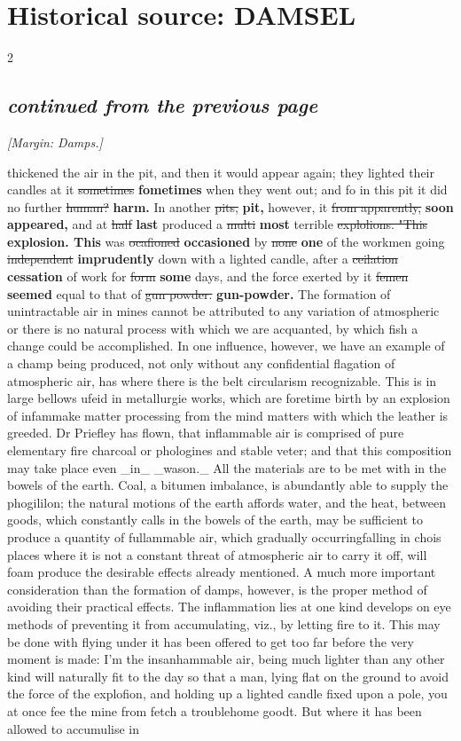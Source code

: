\documentclass[10pt]{article}
\begin{document}
\section*{Historical source: DAMSEL}
\begin{multicols}{2}
\subsection*{\textit{continued from the previous page}}
{\small\itshape [Margin: Damps.]}\par
thickened the air in the pit, and then it would appear again; they lighted their candles at it \sout{sometimes} \textbf{fometimes} when they went out; and fo in this pit it did no further \sout{human?} \textbf{harm.} In another \sout{pits,} \textbf{pit,} however, it \sout{from apparently,} \textbf{soon appeared,} and at \sout{half} \textbf{last} produced a \sout{multi} \textbf{most} terrible \sout{explolions. "This} \textbf{explosion. This} was \sout{ocafioned} \textbf{occasioned} by \sout{none} \textbf{one} of the workmen going \sout{independent} \textbf{imprudently} down with a lighted candle, after a \sout{ceilation} \textbf{cessation} of work for \sout{form} \textbf{some} days, and the force exerted by it \sout{femen} \textbf{seemed} equal to that of \sout{gun powder.} \textbf{gun-powder.} The formation of unintractable air in mines cannot be attributed to any variation of atmospheric or there is no natural process with which we are acquanted, by which fish a change could be accomplished. In one influence, however, we have an example of a champ being produced, not only without any confidential flagation of atmospheric air, has where there is the belt circularism recognizable. This is in large bellows ufeid in metallurgie works, which are foretime birth by an explosion of infammake matter processing from the mind matters with which the leather is greeded. Dr Priefley has flown, that inflammable air is comprised of pure elementary fire charcoal or phologines and stable veter; and that this composition may take place even \_in\_ \_wason.\_ All the materials are to be met with in the bowels of the earth. Coal, a bitumen imbalance, is abundantly able to supply the phogililon; the natural motions of the earth affords water, and the heat, between goods, which constantly calls in the bowels of the earth, may be sufficient to produce a quantity of fullammable air, which gradually occurringfalling in chois places where it is not a constant threat of atmospheric air to carry it off, will foam produce the desirable effects already mentioned. A much more important consideration than the formation of damps, however, is the proper method of avoiding their practical effects. The inflammation lies at one kind develops on eye methods of preventing it from accumulating, viz., by letting fire to it. This may be done with flying under it has been offered to get too far before the very moment is made: I’m the insanhammable air, being much lighter than any other kind will naturally fit to the day so that a man, lying flat on the ground to avoid the force of the explofion, and holding up a lighted candle fixed upon a pole, you at once fee the mine from fetch a troublehome goodt. But where it has been allowed to accumulise in 
\end{multicols}
\end{document}
